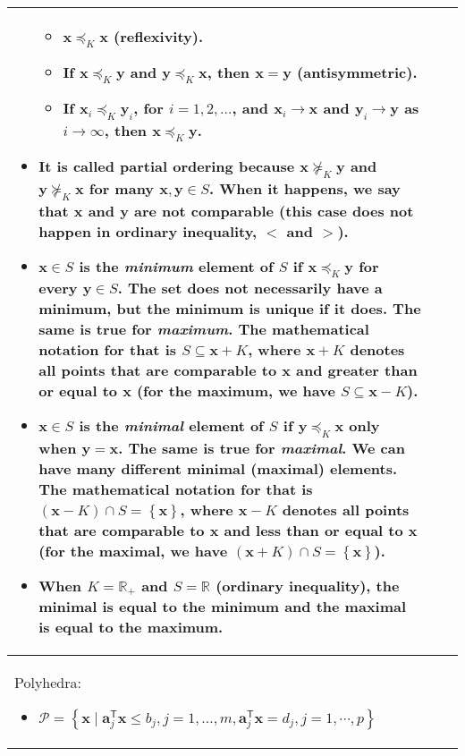 \documentclass{article}
\newcommand{\trans}{\mathsf{T}}
\begin{document}
\begin{table}[ht!]
\begin{tabularx}{\textwidth}{|A|B|C|}
\begin{itemize}[leftmargin=*]
\begin{itemize}[label={$\triangleright$}]
            \item \(\mathbf{x}\preceq_K \mathbf{x}\) (reflexivity).
            \item If \(\mathbf{x}\preceq_K \mathbf{y}\) and \(\mathbf{y}\preceq_K \mathbf{x}\), then \(\mathbf{x} = \mathbf{y}\) (antisymmetric).
            \item If \(\mathbf{x}_i\preceq_K \mathbf{y}_i\), for \(i = 1, 2, \dots\), and \(\mathbf{x}_i \rightarrow \mathbf{x}\) and \(\mathbf{y}_i \rightarrow \mathbf{y}\) as \(i \rightarrow \infty\), then \(\mathbf{x} \preceq_K \mathbf{y}\).
        \end{itemize}
    \item It is called partial ordering because \(\mathbf{x} \nsucceq_K \mathbf{y}\) and \(\mathbf{y} \nsucceq_K \mathbf{x}\) for many \(\mathbf{x}, \mathbf{y} \in S\). When it happens, we say that \(\mathbf{x}\) and \(\mathbf{y}\) are not comparable (this case does not happen in ordinary inequality, \(<\) and \(>\)).
    \item \(\mathbf{x} \in S\) is the \emph{minimum} element of \(S\) if \(\mathbf{x} \preceq_K \mathbf{y}\) for every \(\mathbf{y} \in S\). The set does not necessarily have a minimum, but the minimum is unique if it does. The same is true for \emph{maximum}. The mathematical notation for that is \(S \subseteq \mathbf{x} + K\), where \(\mathbf{x} + K\) denotes all points that are comparable to \(\mathbf{x}\) and greater than or equal to \(\mathbf{x}\) (for the maximum, we have \(S \subseteq \mathbf{x} - K\)).
    \item \(\mathbf{x} \in S\) is the \emph{minimal} element of \(S\) if \(\mathbf{y} \preceq_K \mathbf{x}\) only when \(\mathbf{y} = \mathbf{x}\). The same is true for \emph{maximal}. We can have many different minimal (maximal) elements. The mathematical notation for that is \((\mathbf{x} - K) \cap S = \left\{ \mathbf{x} \right\}\), where \(\mathbf{x} - K\) denotes all points that are comparable to \(\mathbf{x}\) and less than or equal to \(\mathbf{x}\) (for the maximal, we have \((\mathbf{x} + K) \cap S = \left\{ \mathbf{x} \right\}\)).
    \item When \(K = \mathbb{R}_{+}\) and \(S = \mathbb{R}\) (ordinary inequality), the minimal is equal to the minimum and the maximal is equal to the maximum.
\end{itemize} \\
\hline
Polyhedra:
\begin{itemize}[leftmargin=*]
    \item $\mathcal{P} = \left\{ \mathbf{x} \mid \mathbf{a}_j^\trans \mathbf{x} \leq b_j, j=1, \dots, m, \mathbf{a}_j^\trans \mathbf{x} = d_j, j=1,\cdots, p  \right\}$

\end{itemize}
\end{tabularx}
\end{table}
\end{document}
